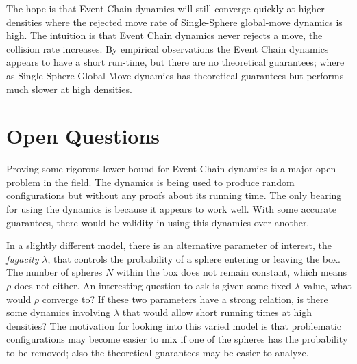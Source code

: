 \documentclass[a4paper,11pt]{article}
\begin{document}
The hope is that Event Chain dynamics will still converge quickly at higher densities where the rejected move rate of Single-Sphere global-move dynamics is high.  The intuition is that Event Chain dynamics never rejects a move, the collision rate increases.  By empirical observations the Event Chain dynamics appears to have a short run-time, but there are no theoretical guarantees; where as Single-Sphere Global-Move dynamics has theoretical guarantees but performs much slower at high densities.

\section*{Open Questions}

Proving some rigorous lower bound for Event Chain dynamics is a major open problem in the field.  The dynamics is being used to produce random configurations but without any proofs about its running time.  The only bearing for using the dynamics is because it appears to work well.  With some accurate guarantees, there would be validity in using this dynamics over another.

In a slightly different model, there is an alternative parameter of interest, the \textit{fugacity} $\lambda$, that controls the probability of a sphere entering or leaving the box. The number of spheres $N$ within the box does not remain constant, which means $\rho$ does not either.  An interesting question to ask is given some fixed $\lambda$ value, what would $\rho$ converge to?  If these two parameters have a strong relation, is there some dynamics involving $\lambda$ that would allow short running times at high densities?  The motivation for looking into this varied model is that problematic configurations may become easier to mix if one of the spheres has the probability to be removed; also the theoretical guarantees may be easier to analyze.
\end{document}
